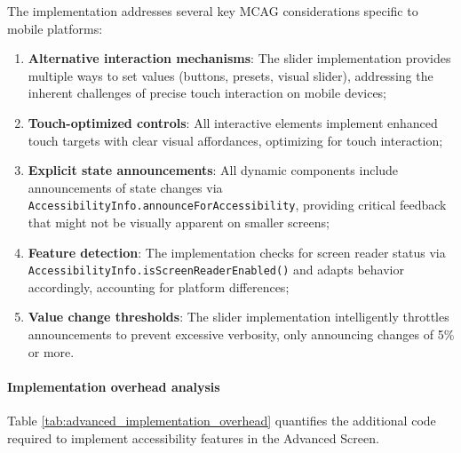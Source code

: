 The implementation addresses several key MCAG considerations specific to mobile platforms:
\begin{enumerate}
    \item \textbf{Alternative interaction mechanisms}: The slider implementation provides multiple ways to set values (buttons, presets, visual slider), addressing the inherent challenges of precise touch interaction on mobile devices;
    
    \item \textbf{Touch-optimized controls}: All interactive elements implement enhanced touch targets with clear visual affordances, optimizing for touch interaction;
    
    \item \textbf{Explicit state announcements}: All dynamic components include announcements of state changes via \texttt{AccessibilityInfo.announceForAccessibility}, providing critical feedback that might not be visually apparent on smaller screens;
    
    \item \textbf{Feature detection}: The implementation checks for screen reader status via \texttt{AccessibilityInfo.isScreenReaderEnabled()} and adapts behavior accordingly, accounting for platform differences;
    
    \item \textbf{Value change thresholds}: The slider implementation intelligently throttles announcements to prevent excessive verbosity, only announcing changes of 5\% or more.
\end{enumerate}

\paragraph{Implementation overhead analysis}

Table \ref{tab:advanced_implementation_overhead} quantifies the additional code required to implement accessibility features in the Advanced Screen.

